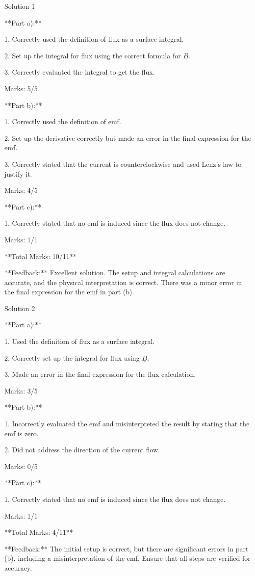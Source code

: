 \documentclass[a4paper,11pt]{article}
\begin{document}
Solution 1

**Part a):**

1. Correctly used the definition of flux as a surface integral.

2. Set up the integral for flux using the correct formula for \(\underline{B}\).

3. Correctly evaluated the integral to get the flux.

Marks: 5/5

**Part b):**

1. Correctly used the definition of emf.

2. Set up the derivative correctly but made an error in the final expression for the emf.

3. Correctly stated that the current is counterclockwise and used Lenz's law to justify it.

Marks: 4/5

**Part c):**

1. Correctly stated that no emf is induced since the flux does not change.

Marks: 1/1

**Total Marks: 10/11**

**Feedback:** Excellent solution. The setup and integral calculations are accurate, and the physical interpretation is correct. There was a minor error in the final expression for the emf in part (b).

Solution 2

**Part a):**

1. Used the definition of flux as a surface integral.

2. Correctly set up the integral for flux using \(\underline{B}\).

3. Made an error in the final expression for the flux calculation.

Marks: 3/5

**Part b):**

1. Incorrectly evaluated the emf and misinterpreted the result by stating that the emf is zero.

2. Did not address the direction of the current flow.

Marks: 0/5

**Part c):**

1. Correctly stated that no emf is induced since the flux does not change.

Marks: 1/1

**Total Marks: 4/11**

**Feedback:** The initial setup is correct, but there are significant errors in part (b), including a misinterpretation of the emf. Ensure that all steps are verified for accuracy.
\end{document}
